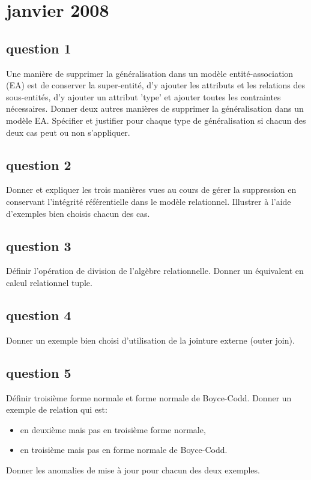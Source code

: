 \section{janvier 2008}

\subsection{question 1}
	Une manière de supprimer la généralisation dans un modèle  entité-association (EA) est de 	conserver la super-entité, d'y ajouter les attributs et les relations des sous-entités, d'y ajouter un attribut 'type' et ajouter toutes les contraintes nécessaires.	Donner deux autres manières de supprimer la généralisation dans un modèle EA. Spécifier et justifier pour chaque type de généralisation si chacun des deux cas peut ou non s'appliquer.


\subsection{question 2}
	Donner et expliquer les trois manières vues au cours de gérer la suppression en conservant l'intégrité référentielle dans le modèle relationnel. Illustrer à l'aide d'exemples bien choisis chacun des cas.

\subsection{question 3}
	Définir l'opération de division de l'algèbre relationnelle. Donner un équivalent en calcul relationnel tuple.
\subsection{question 4}
Donner un exemple bien choisi d’utilisation de la jointure externe (outer join).

\subsection{question 5}
Définir troisième forme normale et forme normale de Boyce-Codd.
Donner un exemple de relation qui est:
\begin{itemize}
	\item en deuxième mais pas en troisième forme normale,
	\item en troisième mais pas en forme normale de Boyce-Codd.
\end{itemize}
Donner les anomalies de mise à jour pour chacun des deux exemples.


